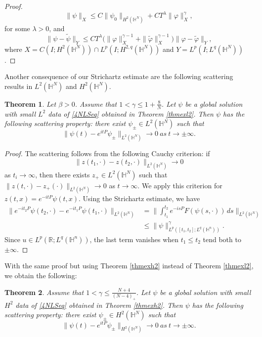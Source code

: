 \documentclass[10pt,leqno]{amsart}
\newtheorem{thm}{Theorem}[section]
\numberwithin{equation}{section}
\newcommand{\field}[1]{\mathbb{#1}}
\newcommand{\R}{\field{R}}          		%
\newcommand{\Hy}{\field{H}}
\begin{document}
\begin{proof}
$$\|\psi\|_X \leq C \|\psi_0\|_{H^2 (\Hy^N)} +CT^\lambda \|\varphi\|_X^\gamma,$$
for some $\lambda >0$, and
$$\|\psi-\tilde{\psi}\|_Y \leq C T^\lambda \big(\|\varphi\|_X^{\gamma -1}+ \|\tilde{\varphi}\|_X^{\gamma -1}\big) \|\varphi-\tilde{\varphi}\|_Y,$$
where $X= C(I; H^2 (\Hy^N)) \cap L^p (I; H^{2,q} (\Hy^N))$ and $Y=L^p (I; L^q (\Hy^N))$.

\end{proof}


Another consequence of our Strichartz estimate are the following scattering results in $L^2 (\Hy^N)$ and $H^2 (\Hy^N)$.

\begin{thm}
Let %
$\beta >0$. Assume that $1<\gamma \leq 1+\tfrac{8}{N}$. Let $\psi$ be a global solution with small $L^2$ data of \eqref{4NLSeq} obtained in Theorem \ref{thmexl2}. Then $\psi$ has the following scattering property: there exist $\psi_\pm \in L^2 (\Hy^N)$ such that
$$\|\psi(t)- e^{itP}\psi_\pm \|_{L^2 (\Hy^N)} \rightarrow 0\ as\ t\rightarrow \pm \infty.$$
\end{thm}

\begin{proof}
The scattering follows from the following Cauchy criterion: if 
\[
\|z(t_1 ,\cdot)-z(t_2 ,\cdot)\|_{L^2 (\Hy^N)} \rightarrow 0
\]
as $t_i \rightarrow \infty$,
 then there exists $z_+ \in L^2 (\Hy^N)$ such that $\|z(t,\cdot)-z_+(\cdot)\|_{L^2 (\Hy^N)}\rightarrow 0$ as $t\rightarrow \infty$.
We apply this criterion for $z(t,x)=e^{-itP}\psi (t,x)$. Using the Strichartz estimate, we have
\begin{align*}\Big\|e^{-it_2 P} \psi (t_2 ,\cdot) - e^{-it_1 P}\psi (t_1 ,\cdot)\Big\|_{L^2 (\Hy^N)} &= \Big\|\int_{t_1}^{t_2} e^{-is P} F(\psi(s,\cdot))\, ds\Big\|_{L^2 (\Hy^N)}\\
&\leq \big\|\psi\big\|_{L^p ([t_1,t_2] ;L^q (\Hy^n))}^\gamma .
\end{align*}
Since $u\in L^p (\R ;L^q (\Hy^n))$, the last term vanishes when $t_1\leq t_2$ tend both to $\pm\infty$.
\end{proof}
With the same proof but using Theorem \ref{thmexh2} instead of Theorem \ref{thmexl2}, we obtain the following:
\begin{thm}
Assume that $1<\gamma \leq \frac{N+4}{(N-4)_+}$. Let $\psi$ be a global solution with small $H^2$ data of \eqref{4NLSeq} obtained in Theorem \ref{thmexh2}. Then $\psi$ has the following scattering property: there exist $\psi_\pm \in H^2 (\Hy^N)$ such that
$$\|\psi(t)- e^{itP}\psi_\pm \|_{H^2 (\Hy^N)} \rightarrow 0\ as\ t\rightarrow \pm \infty.$$
\end{thm}
\end{document}
